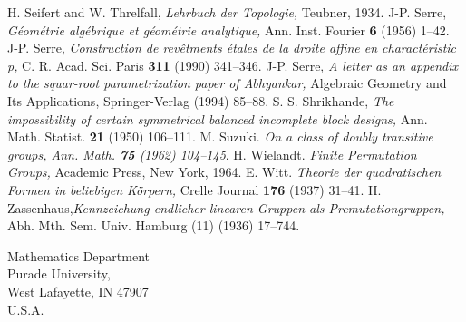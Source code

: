 \begin{thebibliography}{99}
 H. Seifert and W. Threlfall, \textit{Lehrbuch der Topologie,} Teubner, 1934.
 J-P. Serre, \textit{G\'eom\'etrie alg\'ebrique et g\'eom\'etrie analytique,} Ann. Inst. Fourier {\bf 6} (1956) 1--42.
 J-P. Serre, \textit{Construction de rev\^etments \'etales de la droite affine en charact\'eristic p,} C. R. Acad. Sci. Paris {\bf 311} (1990) 341--346.
J-P. Serre, \textit{A letter as an appendix to the squar-root parametrization paper of Abhyankar,} Algebraic Geometry and Its Applications, Springer-Verlag (1994) 85--88.
 S. S. Shrikhande, \textit{The impossibility of certain symmetrical balanced incomplete block designs,} Ann. Math. Statist. {\bf 21} (1950) 106--111.
 M. Suzuki. \textit{On a class of doubly transitive groups, Ann. Math. {\bf 75} (1962) 104--145}.
 H. Wielandt. \textit{Finite Permutation Groups,} Academic Press, New York, 1964.
 E. Witt. \textit{Theorie der quadratischen Formen in beliebigen K\"orpern,} Crelle Journal {\bf 176} (1937) 31--41.
 H. Zassenhaus,\pageoriginale \textit{Kennzeichung endlicher linearen Gruppen als Premutationgruppen,} Abh. Mth. Sem. Univ. Hamburg {\rm (11)} (1936) 17--744.
\end{thebibliography}

\bigskip
\begin{flushleft}
Mathematics Department\\
Purade University,\\
West Lafayette, IN 47907\\
U.S.A.
\end{flushleft}
